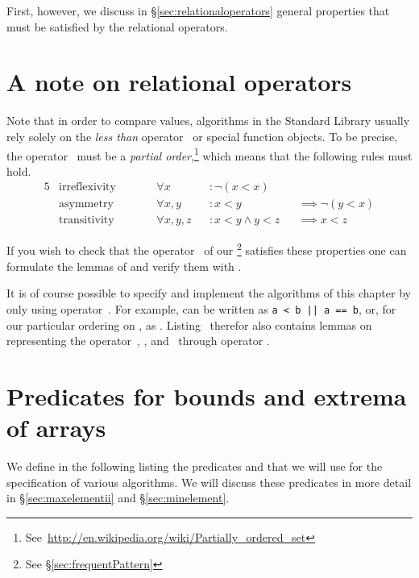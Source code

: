 First, however, we discuss in \S\ref{sec:relationaloperators}
general properties that must be satisfied by the relational operators.


\section{A note on relational operators}

Note that in order to compare values, algorithms in the
\cxx Standard Library \cite[\S 28.7.8]{cxx-17-draft} usually rely solely on 
the \emph{less than} operator~\inl{<} or special function
objects.
To be precise, the operator~\inl{<} must be a \emph{partial
order},\footnote{
    See~\url{http://en.wikipedia.org/wiki/Partially_ordered_set}
}
which means that the following rules must hold.
%
\begin{alignat*}{5}
&\text{irreflexivity} &&\qquad  \forall x     &&: \neg(x < x)         \\
&\text{asymmetry}     &&\qquad  \forall x,y   &&: x < y             &&\implies \neg(y < x)\\
&\text{transitivity}  &&\qquad  \forall x,y,z &&: x < y \wedge y < z &&\implies x < z
\end{alignat*}


If you wish to check that the operator~\inl{<} of our \footnote{
    See \S\ref{sec:frequentPattern}
}  satisfies these properties
one can formulate the lemmas of  and verify them with \framac.



It is of course possible to specify and implement the algorithms
of this chapter by only using operator~\inl{<}.
For example,  can be written as \texttt{a < b || a == b},
or, for our particular ordering on , as .
Listing~ therefor also contains lemmas on representing
the operator~\inl{>}, \inl{<=}, and~\inl{>=} through operator \inl{<}.



\section{Predicates for bounds and extrema of arrays}
\label{sec:arraybounds}

We define in the following listing the predicates 
and  that we will use for the specification of various algorithms.
We will discuss these predicates in more detail in \S\ref{sec:maxelementii}
and \S\ref{sec:minelement}.

